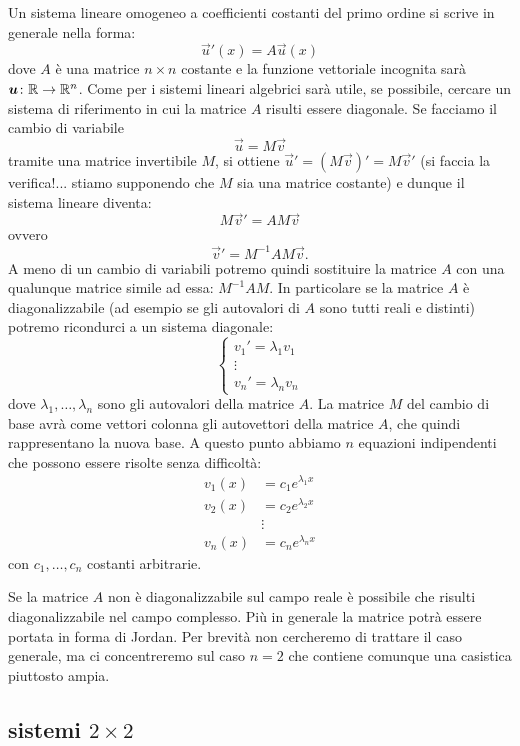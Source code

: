 Un sistema lineare omogeneo a coefficienti costanti del primo ordine si
scrive in generale nella forma:
\[
  \vec u'(x) = A \vec u(x)
\]
dove $A$ è una matrice $n\times n$ costante
e la funzione vettoriale incognita sarà
$\boldsymbol u \colon {\mathbb R}\to {\mathbb R}^n$.
Come per i sistemi lineari algebrici sarà utile, se possibile,
cercare un sistema di riferimento
in cui la matrice $A$ risulti essere diagonale. Se facciamo il cambio di variabile
\[
  \vec u = M \vec v
\]
tramite una matrice invertibile $M$, si ottiene $\vec u' = (M \vec v)' = M \vec v'$
(si faccia la verifica!... stiamo supponendo che $M$ sia una matrice costante)
e dunque il sistema lineare diventa:
\[
 M \vec v' = A M \vec v
\]
ovvero
\[
  \vec v' = M^{-1} A M \vec v.
\]
A meno di un cambio di variabili potremo quindi sostituire la matrice $A$
con una qualunque matrice simile ad essa: $M^{-1} A M$. In particolare se
la matrice $A$ è diagonalizzabile (ad esempio se gli autovalori di $A$ sono
tutti reali e distinti)
potremo ricondurci a un sistema diagonale:
\[
\begin{cases}
 v_1' = \lambda_1 v_1 \\
      \vdots\\
 v_n' = \lambda_n v_n
\end{cases}
\]
dove $\lambda_1, \dots, \lambda_n$ sono gli autovalori della matrice $A$.
La matrice $M$ del cambio di base avrà come vettori colonna gli autovettori
della matrice $A$, che quindi rappresentano la nuova base. A questo punto
abbiamo $n$ equazioni indipendenti che possono essere risolte
senza difficoltà:
\begin{align*}
  v_1(x) &= c_1 e^{\lambda_1 x}\\
  v_2(x) &= c_2 e^{\lambda_2 x}\\
  &\vdots \\
  v_n(x) &= c_n e^{\lambda_n x}
\end{align*}
con $c_1, \dots, c_n$ costanti arbitrarie.

Se la matrice $A$ non è diagonalizzabile sul campo reale è possibile che
risulti diagonalizzabile nel campo complesso. Più in generale la matrice
potrà essere portata in forma di Jordan. Per brevità non cercheremo di
trattare il caso generale, ma ci concentreremo sul caso $n=2$ che
contiene comunque una casistica piuttosto ampia.

\subsection{sistemi $2\times 2$}

